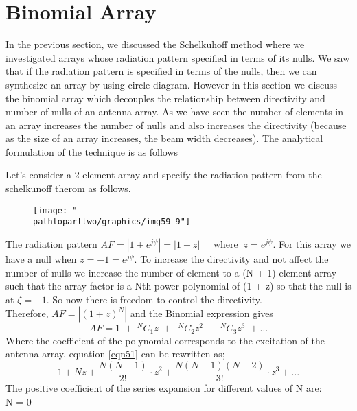 \chapter{Binomial Array}	
In the previous section, we discussed the Schelkuhoff method where we investigated arrays whose radiation pattern specified in terms of its nulls. We saw that if the radiation pattern is specified in terms of the nulls, then we can synthesize an array by using circle diagram. However in this section we discuss the binomial array which decouples the relationship between directivity and number of nulls of an antenna array. As we have seen the number of elements in an array increases the number of nulls and also increases the directivity (because as the size of an array increases, the beam width decreases). The analytical formulation of the technique is as follows

Let's consider a 2 element array and specify the radiation pattern from the schelkunoff therom as follows.\\
\begin{figure}[h]
\centering
\texttt{[image: "\\pathtoparttwo/graphics/img59\_9"]}
\caption{}
\label{fig:fig-11}
\end{figure}

The radiation pattern $AF = |1 + e^{j\psi}| = |1 + z| \; \; \; \; \; \text{where} \; \; z =  e^{j\psi}$. For this array we have a null when $z = -1 =  e^{j\psi}$. To increase the directivity and not affect the number of nulls we increase the number of element to a (N + 1) element array such that the array factor is a Nth power polynomial of (1 + z) so that the null is at $\zeta = -1$. So now there is freedom to control the directivity.\\
Therefore, $AF = |(1 + z)^N|$ and the Binomial expression gives 
\begin{equation}
AF = 1\;  +\;  {^NC_1z} \; +\; \; {^NC_2z^2} +\; \; {^NC_3z^3} \; + \ldots
\label{eqn51}
\end{equation}
Where the coefficient of the polynomial corresponds to the excitation of the antenna array. equation \ref{eqn51} can be rewritten as;
\begin{equation}
1 + Nz + \dfrac{N(N - 1)}{2!}\cdot z^2 + \dfrac{N(N - 1)(N - 2)}{3!}\cdot z^3 + \ldots\label{eqn52}
\end{equation}
The positive coefficient of the series expansion for different values of N are:\\

N = 0\; \; \; \; \; \; \; \; \; \; \; \; \; \; \;\; \; \; \; \\

